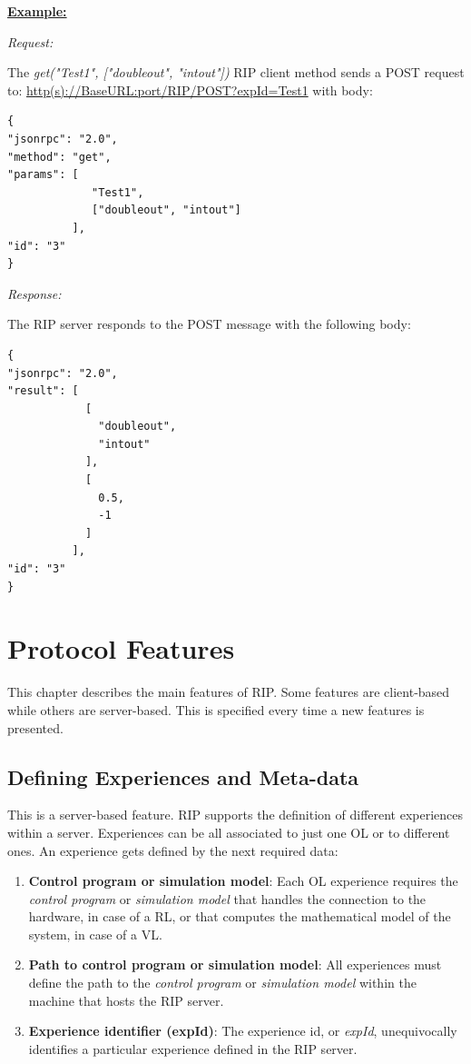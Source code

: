 \textbf{\underline{Example:}}

\textit{Request:}

The \textit{get("Test1", ["doubleout", "intout"])} RIP client method sends a POST request to: \url{http(s)://BaseURL:port/RIP/POST?expId=Test1} with body:

\begin{lstlisting}
{
"jsonrpc": "2.0",
"method": "get",
"params": [
  	         "Test1",
  	         ["doubleout", "intout"]
          ],
"id": "3"
}
\end{lstlisting}

\textit{Response:}

The RIP server responds to the POST message with the following body:

\begin{lstlisting}
{
"jsonrpc": "2.0",
"result": [
            [
              "doubleout",
              "intout"
            ],
            [
              0.5,
              -1
            ]
          ],
"id": "3"
}
\end{lstlisting}


\chapter{Protocol Features}
\label{System Features}

This chapter describes the main features of RIP. Some features are client-based while others are server-based. This is specified every time a new features is presented.

\section{Defining Experiences and Meta-data}
This is a server-based feature. RIP supports the definition of different experiences within a server. Experiences can be all associated to just one OL or to different ones. An experience gets defined by the next required data:

\begin{enumerate}
    \item \textbf{Control program or simulation model}: Each OL experience requires the \textit{control program} or \textit{simulation model} that handles the connection to the hardware, in case of a RL, or that computes the mathematical model of the system, in case of a VL.
    \item \textbf{Path to control program or simulation model}: All experiences must define the path to the \textit{control program} or \textit{simulation model} within the machine that hosts the RIP server.
    \item \textbf{Experience identifier (expId)}: The experience id, or \textit{expId}, unequivocally identifies a particular experience defined in the RIP server.
\end{enumerate}

